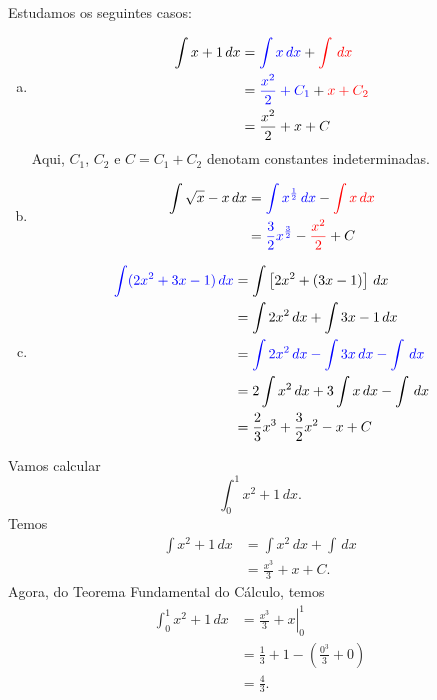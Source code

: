 \begin{ex}
  Estudamos os seguintes casos:
  \begin{enumerate}[a)]
  \item
    \begin{align}
      \int x + 1\,dx &= {\color{blue}\int x\,dx} + {\color{red}\int\,dx}\\
                     &= {\color{blue}\frac{x^2}{2} + C_1} + {\color{red}x + C_2}\\
                     &= \frac{x^2}{2} + x + C
    \end{align}
    Aqui, $C_1$, $C_2$ e $C = C_1+C_2$ denotam constantes indeterminadas.
  \item
    \begin{align}
      \int \sqrt{x} - x\,dx &= {\color{blue}\int x^{\frac{1}{2}}\,dx} - {\color{red}\int x\,dx}\\
                            &= {\color{blue}\frac{3}{2}x^{\frac{3}{2}}} - {\color{red}\frac{x^2}{2}} + C
    \end{align}
  \item
    \begin{align}
      {\color{blue}\int (2x^2 + 3x - 1)\,dx} &= \int \left[2x^2 + (3x - 1)\right]\,dx\\
                                             &= \int 2x^2\,dx + \int 3x - 1 \,dx \\
                                             &= {\color{blue}\int 2x^2\,dx - \int 3x\,dx - \int \,dx}\\
                                             &= 2\int x^2\,dx + 3\int x\,dx - \int \,dx\\
                                             &= \frac{2}{3}x^3 + \frac{3}{2}x^2 - x + C
    \end{align}
  \end{enumerate}
\end{ex}

\begin{ex}
  Vamos calcular
  \begin{equation}
    \int_{0}^1 x^2 + 1\,dx.
  \end{equation}
  Temos
  \begin{align}
    \int x^2 + 1\,dx &= \int x^2\,dx + \int \,dx\\
                     &= \frac{x^3}{3} + x + C.
  \end{align}
  Agora, do Teorema Fundamental do Cálculo, temos
  \begin{align}
    \int_0^1 x^2+1\,dx &= \left. \frac{x^3}{3} + x\right|_0^1 \\
                       &= \frac{1}{3} + 1 - \left(\frac{0^3}{3} + 0\right) \\
                       &= \frac{4}{3}.
  \end{align}
\end{ex}

